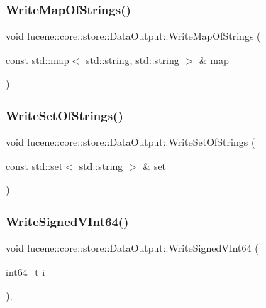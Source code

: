 \subsubsection{\texorpdfstring{Write\+Map\+Of\+Strings()}{WriteMapOfStrings()}}
{\footnotesize\ttfamily void lucene\+::core\+::store\+::\+Data\+Output\+::\+Write\+Map\+Of\+Strings (\begin{DoxyParamCaption}\item[{\mbox{\hyperlink{ZlibCrc32_8h_a2c212835823e3c54a8ab6d95c652660e}{const}} std\+::map$<$ std\+::string, std\+::string $>$ \&}]{map }\end{DoxyParamCaption})\hspace{0.3cm}{\ttfamily [inline]}}

\mbox{\label{classlucene_1_1core_1_1store_1_1DataOutput_af22effd34a9fa2b51d166c8ccc03ea03}} 
\subsubsection{\texorpdfstring{Write\+Set\+Of\+Strings()}{WriteSetOfStrings()}}
{\footnotesize\ttfamily void lucene\+::core\+::store\+::\+Data\+Output\+::\+Write\+Set\+Of\+Strings (\begin{DoxyParamCaption}\item[{\mbox{\hyperlink{ZlibCrc32_8h_a2c212835823e3c54a8ab6d95c652660e}{const}} std\+::set$<$ std\+::string $>$ \&}]{set }\end{DoxyParamCaption})\hspace{0.3cm}{\ttfamily [inline]}}

\mbox{\label{classlucene_1_1core_1_1store_1_1DataOutput_abf3dcbf20c57bc8a52ec45f08ef65264}} 
\subsubsection{\texorpdfstring{Write\+Signed\+V\+Int64()}{WriteSignedVInt64()}}
{\footnotesize\ttfamily void lucene\+::core\+::store\+::\+Data\+Output\+::\+Write\+Signed\+V\+Int64 (\begin{DoxyParamCaption}\item[{int64\+\_\+t}]{i }\end{DoxyParamCaption})\hspace{0.3cm}{\ttfamily [inline]}, {\ttfamily [private]}}

